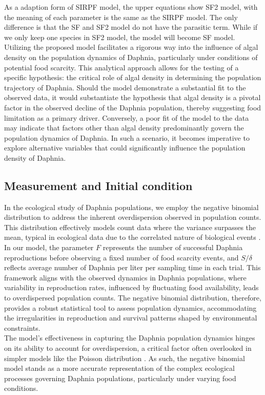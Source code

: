 \documentclass[12pt]{article}
\begin{document}
As a adaption form of SIRPF model, the upper equations show SF2 model, with the meaning of each parameter is the same as the SIRPF model. The only difference is that the SF and SF2 model do not have the parasitic term. While if we only keep one species in SF2 model, the model will become SF model. Utilizing the proposed model facilitates a rigorous way into the influence of algal density on the population dynamics of Daphnia, particularly under conditions of potential food scarcity. This analytical approach allows for the testing of a specific hypothesis: the critical role of algal density in determining the population trajectory of Daphnia. Should the model demonstrate a substantial fit to the observed data, it would substantiate the hypothesis that algal density is a pivotal factor in the observed decline of the Daphnia population, thereby suggesting food limitation as a primary driver. Conversely, a poor fit of the model to the data may indicate that factors other than algal density predominantly govern the population dynamics of Daphnia. In such a scenario, it becomes imperative to explore alternative variables that could significantly influence the population density of Daphnia.\\

\subsection{Measurement and Initial condition}
In the ecological study of Daphnia populations, we employ the negative binomial distribution to address the inherent overdispersion observed in population counts. This distribution effectively models count data where the variance surpasses the mean, typical in ecological data due to the correlated nature of biological events \citep{ning2021systemic}. In our model, the parameter $F$ represents the number of successful Daphnia reproductions before observing a fixed number of food scarcity events, and $S / \delta$ reflects average number of Daphnia per liter per sampling time in each trial. This framework aligns with the observed dynamics in Daphnia populations, where variability in reproduction rates, influenced by fluctuating food availability, leads to overdispersed population counts. The negative binomial distribution, therefore, provides a robust statistical tool to assess population dynamics, accommodating the irregularities in reproduction and survival patterns shaped by environmental constraints.\\

The model's effectiveness in capturing the Daphnia population dynamics hinges on its ability to account for overdispersion, a critical factor often overlooked in simpler models like the Poisson distribution \citep{breto2011compound}. As such, the negative binomial model stands as a more accurate representation of the complex ecological processes governing Daphnia populations, particularly under varying food conditions.
\end{document}
